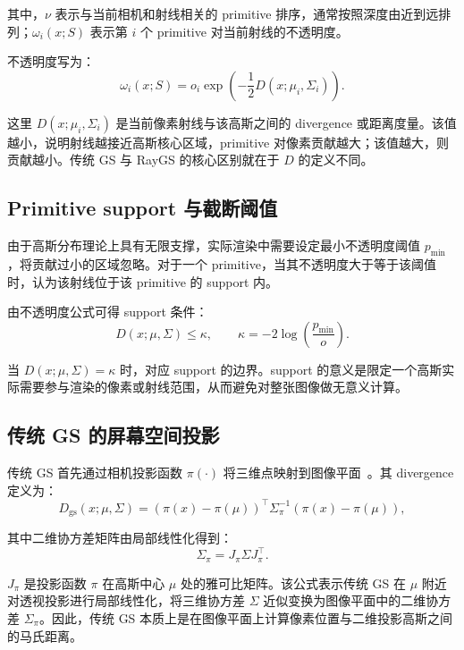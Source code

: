 \documentclass[12pt,hyperref,a4paper,UTF8]{ctexart}
\begin{document}
其中，$\nu$ 表示与当前相机和射线相关的 primitive 排序，通常按照深度由近到远排列；$\omega_i(x;S)$ 表示第 $i$ 个 primitive 对当前射线的不透明度。

不透明度写为：
\begin{equation}
\displaystyle
\omega_i(x;S)
=
o_i \exp\!\left(
-\frac{1}{2}D(x;\mu_i,\Sigma_i)
\right).
\end{equation}

这里 $D(x;\mu_i,\Sigma_i)$ 是当前像素射线与该高斯之间的 divergence 或距离度量。该值越小，说明射线越接近高斯核心区域，primitive 对像素贡献越大；该值越大，则贡献越小。传统 GS 与 RayGS 的核心区别就在于 $D$ 的定义不同。



\subsection{Primitive support 与截断阈值}
由于高斯分布理论上具有无限支撑，实际渲染中需要设定最小不透明度阈值 $p_{\min}$，将贡献过小的区域忽略。对于一个 primitive，当其不透明度大于等于该阈值时，认为该射线位于该 primitive 的 support 内。

由不透明度公式可得 support 条件：
\begin{equation}
\displaystyle
D(x;\mu,\Sigma) \leq \kappa ,
\qquad
\kappa
=
-2\log\!\left(\frac{p_{\min}}{o}\right).
\end{equation}

当 $D(x;\mu,\Sigma)=\kappa$ 时，对应 support 的边界。support 的意义是限定一个高斯实际需要参与渲染的像素或射线范围，从而避免对整张图像做无意义计算。



\subsection{传统 GS 的屏幕空间投影}
传统 GS 首先通过相机投影函数 $\pi(\cdot)$ 将三维点映射到图像平面~\cite{3dgaussiansplatting}。其 divergence 定义为：
\begin{equation}
\displaystyle
D_{\mathrm{gs}}(x;\mu,\Sigma)
=
\left(\pi(x)-\pi(\mu)\right)^\top
\Sigma_{\pi}^{-1}
\left(\pi(x)-\pi(\mu)\right),
\end{equation}

其中二维协方差矩阵由局部线性化得到：
\begin{equation}
\displaystyle
\Sigma_{\pi}
=
J_{\pi}\Sigma J_{\pi}^{\top}.
\end{equation}

$J_{\pi}$ 是投影函数 $\pi$ 在高斯中心 $\mu$ 处的雅可比矩阵。该公式表示传统 GS 在 $\mu$ 附近对透视投影进行局部线性化，将三维协方差 $\Sigma$ 近似变换为图像平面中的二维协方差 $\Sigma_{\pi}$。因此，传统 GS 本质上是在图像平面上计算像素位置与二维投影高斯之间的马氏距离。
\end{document}
